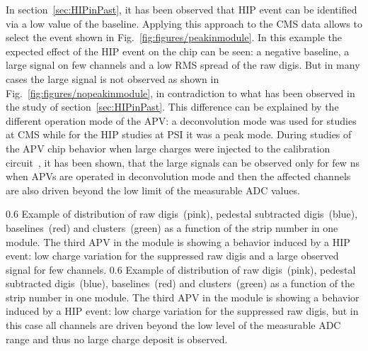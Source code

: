 In section~\ref{sec:HIPinPast}, it has been observed that HIP event can be identified via a low value of the baseline. Applying this approach to the CMS data allows to select the event shown in Fig.~\ref{fig:figures/peakinmodule}. In this example the expected effect of the HIP event on the chip can be seen: a negative baseline, a large signal on few channels and a low RMS spread of the raw digis. But in many cases the large signal is not observed as shown in Fig.~\ref{fig:figures/nopeakinmodule}, in contradiction to what has been observed in the study of section~\ref{sec:HIPinPast}. This difference can be explained by the different operation mode of the APV: a deconvolution mode was used for studies at CMS while for the HIP studies at PSI it was a peak mode. During studies of the APV chip behavior when large charges were injected to the calibration circuit~\cite{Bainbridge:2002bda}, it has been shown, that the large signals can be observed only for few ns when APVs are operated in deconvolution mode and then the affected channels are also driven beyond the low limit of the measurable ADC values. 

                 {0.6}       %
                 {Example of distribution of raw digis~(pink), pedestal subtracted digis~(blue), baselines~(red) and clusters~(green) as a function of the strip number in one module. The third APV in the module is showing a behavior induced by a HIP event: low charge variation for the suppressed raw digis and a large observed signal for few channels. } %
                 {0.6}       %
                 {Example of distribution of raw digis~(pink), pedestal subtracted digis~(blue), baselines~(red) and clusters~(green) as a function of the strip number in one module. The third APV in the module is showing a behavior induced by a HIP event: low charge variation for the suppressed raw digis, but in this case all channels are driven beyond the low level of the measurable ADC range and thus no large charge deposit is observed. } %

